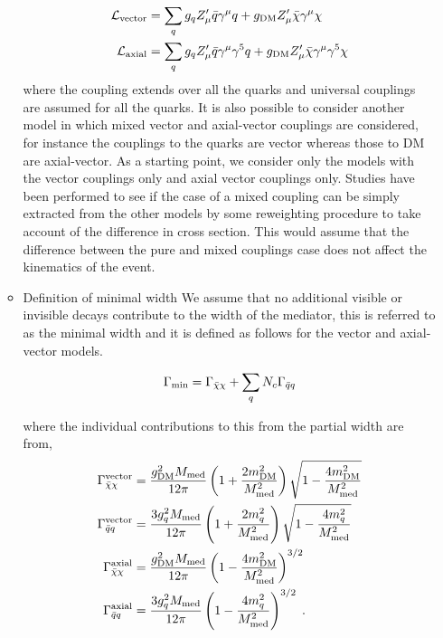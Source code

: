 \begin{itemize}
\begin{itemize}
\begin{align}
\label{eq:AV} 
\mathcal{L}_{\mathrm{vector}} &= \sum_q \gq Z'_{\mu} \bar{q}\gamma^{\mu}q + \gDM Z'_{\mu} \bar{\chi}\gamma^{\mu}\chi \\
\mathcal{L}_{\rm{axial}} &= \sum_q \gq Z'_{\mu} \bar{q}\gamma^{\mu}\gamma^5q + \gDM Z'_{\mu} \bar{\chi}\gamma^{\mu}\gamma^5\chi
\end{align}
where the coupling extends over all the quarks and universal couplings are assumed for all the quarks. 
It is also possible to consider another model in which mixed vector and axial-vector couplings are considered, for instance the couplings to the quarks are vector whereas those to DM are axial-vector. As a starting point, we consider only the models with the vector couplings only and axial vector couplings only. Studies have been performed to see if the case of a mixed coupling can be simply extracted from the other models by some reweighting procedure to take account of the difference in cross section. This would assume that the difference between the pure and mixed couplings case does not affect the kinematics of the event. 


 \item Definition of minimal width
We assume that no additional visible or invisible decays contribute to the width of the mediator, this is referred to as the minimal width and it is defined as follows for the vector and axial-vector models.

\begin{equation}
\Gamma_{\rm{min}}=\Gamma_{\bar{\chi}\chi} + \sum_{q}N_{c}\Gamma_{\bar{q}q}
\end{equation}

where the individual contributions to this from the partial width are from,
\begin{align}
\Gamma_{\bar{\chi}\chi}^{\rm{vector}}&=\frac{\gDM^2 \mMed}{12\pi}\left(1+\frac{2 \mDM^2}{\mMed^2} \right)\sqrt{1-\frac{4 \mDM^2}{\mMed^2}}\\
\Gamma_{\bar{q}q}^{\rm{vector}}&= \frac{3 \gq^2 \mMed}{12\pi}\left(1+\frac{2 m_q^2}{\mMed^2} \right)\sqrt{1-\frac{4 m_q^2}{\mMed^2}}\\
\Gamma_{\bar{\chi}\chi}^{\rm{axial}}&=\frac{\gDM^2 \mMed}{12\pi} \left(1-\frac{4 \mDM^2}{\mMed^2}\right)^{3/2}\\
\Gamma_{\bar{q}q}^{\rm{axial}}&= \frac{3 \gq^2 \mMed}{12\pi}\left(1-\frac{4 m_q^2}{\mMed^2}\right)^{3/2}\label{eq:Gamma4}\;.
\end{align}


\end{itemize}
\end{itemize}
